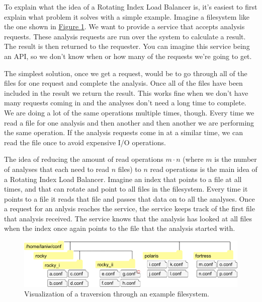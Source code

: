 \documentclass[11pt]{article} %
\newcommand{\rilb}{Rotating Index Load Balancer}
\newcommand{\hidelinks}[1]{{\hypersetup{hidelinks}#1}}
\newcommand{\figref}[1]{\hidelinks{\hyperref[#1]{Figure \ref{#1}}}}
\newcommand{\ai}[1]{\textcolor{red}{$A_1$}}
\begin{document}
  To explain what the idea of a \rilb{} is, it's easiest to first explain what problem it solves with a simple example. Imagine a filesystem like the one shown in \figref{fig:rilb-vis}. We want to provide a service that accepts analysis requests. These analysis requests are run over the system to calculate a result. The result is then returned to the requester. You can imagine this service being an API, so we don't know when or how many of the requests we're going to get.

  The simplest solution, once we get a request, would be to go through all of the files for one request and complete the analysis. Once all of the files have been included in the result we return the result. This works fine when we don't have many requests coming in and the analyses don't need a long time to complete. We are doing a lot of the same operations multiple times, though. Every time we read a file for one analysis and then another and then another we are performing the same operation. If the analysis requests come in at a similar time, we can read the file once to avoid expensive I/O operations.

  The idea of reducing the amount of read operations $m \cdot n$ (where $m$ is the number of analyses that each need to read $n$ files) to $n$ read operations is the main idea of a \rilb{}. Imagine an index that points to a file at all times, and that can rotate and point to all files in the filesystem. Every time it points to a file it reads that file and passes that data on to all the analyses. Once a request for an anlysis reaches the service, the service keeps track of the first file that analysis received. The service knows that the analysis has looked at all files when the index once again points to the file that the analysis started with.

  \begin{figure}[H]
    \centering
    \includegraphics[width=.99\linewidth, keepaspectratio]{res/rilb_visualization}
    \caption{Visualization of a \newcommand{\ai}[1]{\textcolor{red}{#1}}{} traversion through an example filesystem.}
    \label{fig:rilb-vis}
  \end{figure}
\end{document}

